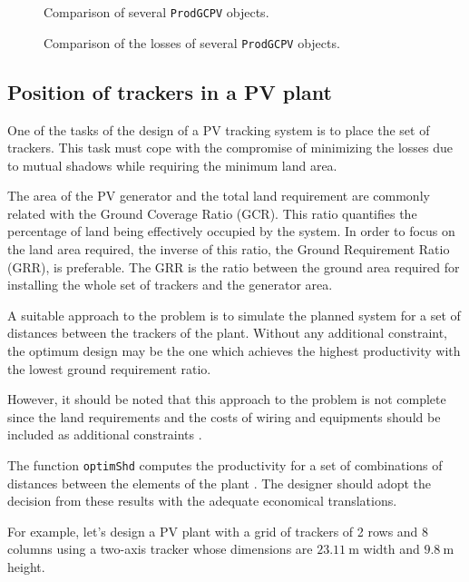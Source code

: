 \documentclass[a4paper]{article}
\newcommand{\code}[1]{{\texttt{#1}}}
\begin{document}
 
\begin{figure}
  \centering
  \caption{Comparison of several \code{ProdGCPV} objects.}
  \label{fig:compare}
\end{figure}

\begin{figure}
  \centering
  \caption{Comparison of the losses of several \code{ProdGCPV} objects.}
  \label{fig:compareLosses}
\end{figure}


\subsection{Position of trackers in a PV plant}
\label{sec:trackers}
One of the tasks of the design of a PV tracking system is to place the
set of trackers. This task must cope with the compromise of minimizing
the losses due to mutual shadows while requiring the minimum land
area.

The area of the PV generator and the total land requirement are
commonly related with the Ground Coverage Ratio (GCR). This ratio
quantifies the percentage of land being effectively occupied by the
system. In order to focus on the land area required, the inverse of
this ratio, the Ground Requirement Ratio (GRR), is preferable. The GRR
is the ratio between the ground area required for installing the whole
set of trackers and the generator area.

A suitable approach to the problem is to simulate the planned system
for a set of distances between the trackers of the plant. Without any
additional constraint, the optimum design may be the one which
achieves the highest productivity with the lowest ground requirement
ratio. 

However, it should be noted that this approach to the problem is not
complete since the land requirements and the costs of wiring and
equipments should be included as additional constraints
\cite{Perpinan2011b}.

The function \code{optimShd} computes the productivity for a set of
combinations of distances between the elements of the plant
\cite{Perpinan2008}. The designer should adopt the decision from
these results with the adequate economical translations.

For example, let's design a PV plant with a grid of trackers of 2 rows
and 8 columns using a two-axis tracker whose dimensions are
$\SI{23.11}{\meter}$ width and $\SI{9.8}{\meter}$ height.
\end{document}
